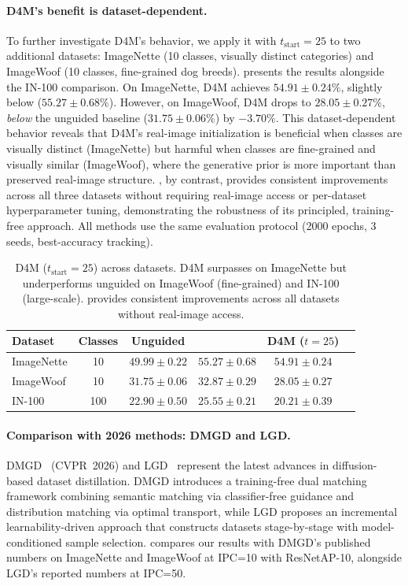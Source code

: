 \paragraph{D4M's benefit is dataset-dependent.}
To further investigate D4M's behavior, we apply it with $t_{\text{start}} = 25$ to two additional datasets: ImageNette (10 classes, visually distinct categories) and ImageWoof (10 classes, fine-grained dog breeds).  presents the results alongside the IN-100 comparison. On ImageNette, D4M achieves $54.91 \pm 0.24\%$, slightly below \cags{} ($55.27 \pm 0.68\%$). However, on ImageWoof, D4M drops to $28.05 \pm 0.27\%$, \emph{below} the unguided baseline ($31.75 \pm 0.06\%$) by $-3.70\%$. This dataset-dependent behavior reveals that D4M's real-image initialization is beneficial when classes are visually distinct (ImageNette) but harmful when classes are fine-grained and visually similar (ImageWoof), where the generative prior is more important than preserved real-image structure. \cags{}, by contrast, provides consistent improvements across all three datasets without requiring real-image access or per-dataset hyperparameter tuning, demonstrating the robustness of its principled, training-free approach. All methods use the same evaluation protocol (2000 epochs, 3 seeds, best-accuracy tracking).

\begin{table}[t]
\centering
\caption{D4M ($t_{\text{start}}{=}25$) across datasets. D4M surpasses \cags{} on ImageNette but underperforms unguided on ImageWoof (fine-grained) and IN-100 (large-scale). \cags{} provides consistent improvements across all datasets without real-image access.}
\label{tab:d4m-cross}
\begin{tabular}{lccccc}
\toprule
\textbf{Dataset} & \textbf{Classes} & \textbf{Unguided} & \textbf{\cags{}} & \textbf{D4M ($t{=}25$)} \\
\midrule
ImageNette & 10 & $49.99 \pm 0.22$ & $\mathbf{55.27 \pm 0.68}$ & $54.91 \pm 0.24$ \\
ImageWoof & 10 & $31.75 \pm 0.06$ & $\mathbf{32.87 \pm 0.29}$ & $28.05 \pm 0.27$ \\
IN-100 & 100 & $22.90 \pm 0.50$ & $\mathbf{25.55 \pm 0.21}$ & $20.21 \pm 0.39$ \\
\bottomrule
\end{tabular}
\end{table}

\paragraph{Comparison with 2026 methods: DMGD and LGD.}
DMGD~\cite{wang2026dmgd} (CVPR~2026) and LGD~\cite{chansantiago2026learnabilityguided} represent the latest advances in diffusion-based dataset distillation. DMGD introduces a training-free dual matching framework combining semantic matching via classifier-free guidance and distribution matching via optimal transport, while LGD proposes an incremental learnability-driven approach that constructs datasets stage-by-stage with model-conditioned sample selection.  compares our results with DMGD's published numbers on ImageNette and ImageWoof at IPC=10 with ResNetAP-10, alongside LGD's reported numbers at IPC=50.

